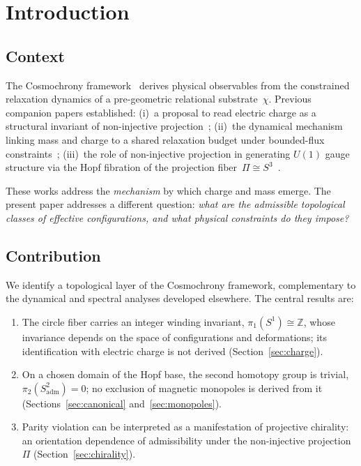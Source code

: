 \documentclass[11pt,a4paper]{article}
\begin{document}
  \clearpage
  \tableofcontents

  \clearpage
  \section{Introduction}
    \label{sec:intro}

    \subsection{Context}

      The Cosmochrony framework~\cite{Cosmochrony} derives physical observables
      from the constrained relaxation dynamics of a pre-geometric relational
      substrate~$\chi$.
      Previous companion papers established:
      (i)~a proposal to read electric charge as a structural invariant of
      non-injective projection~\cite{Cosmochrony,Beau2026e};
      (ii)~the dynamical mechanism linking mass and charge to a shared
      relaxation budget under bounded-flux constraints~\cite{Beau2026e};
      (iii)~the role of non-injective projection in generating $U(1)$ gauge
      structure via the Hopf fibration of the projection
      fiber~$\Pi \cong S^3$~\cite{Cosmochrony}.

      These works address the \emph{mechanism} by which charge and mass emerge.
      The present paper addresses a different question:
      \emph{what are the admissible topological classes of effective
      configurations, and what physical constraints do they impose?}

    \subsection{Contribution}

      We identify a topological layer of the Cosmochrony framework,
      complementary to the dynamical and spectral analyses developed
      elsewhere.
      The central results are:
      \begin{enumerate}[label=(\arabic*)]
\item The circle fiber carries an integer winding invariant,
$\pi_1(S^1) \cong \mathbb{Z}$, whose invariance depends on the space of
configurations and deformations; its identification with electric charge is
not derived (Section~\ref{sec:charge}).
\item On a chosen domain of the Hopf base, the second homotopy group is
trivial, $\pi_2(S^2_{\mathrm{adm}}) = 0$; no exclusion of magnetic
monopoles is derived from it
(Sections~\ref{sec:canonical} and~\ref{sec:monopoles}).
\item Parity violation can be interpreted as a manifestation of
projective chirality: an orientation dependence of admissibility
under the non-injective projection~$\Pi$
(Section~\ref{sec:chirality}).
      \end{enumerate}
\end{document}
